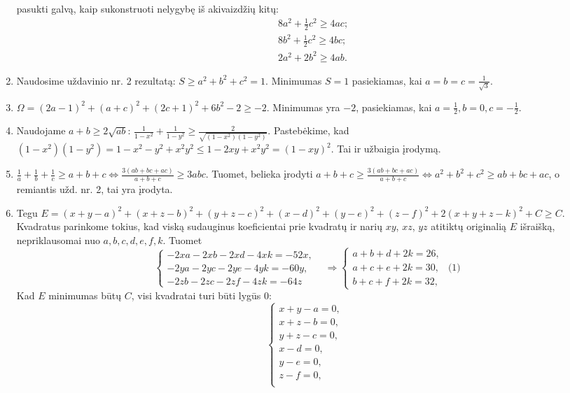 \begin{enumerate}
    pasukti galvą, kaip sukonstruoti nelygybę iš akivaizdžių kitų:
    \begin{align*}
    &8a^2+\frac{1}{2}c^2\geq 4ac;\\ &8b^2+\frac{1}{2}c^2\geq 4bc;\\
    &2a^2+2b^2\geq4ab. \end{align*}
\item
    Naudosime uždavinio nr. 2 rezultatą: $S\geq a^2+b^2+c^2=1.$ Minimumas
    $S=1$ pasiekiamas, kai $a=b=c=\frac{1}{\sqrt{3}}$.
\item
    $\Omega=(2a-1)^2+(a+c)^2+(2c+1)^2+6b^2-2\geq -2$. Minimumas yra $-2$,
    pasiekiamas, kai $a=\frac{1}{2}, b=0, c=-\frac{1}{2}$.
\item
    Naudojame $a+b\geq2\sqrt{ab}$:
    $\frac{1}{1-x^2}+\frac{1}{1-y^2}\geq\frac{2}{\sqrt{(1-x^2)(1-y^2)}}$.
    Pastebėkime, kad
    $(1-x^2)(1-y^2)=1-x^2-y^2+x^2y^2\leq1-2xy+x^2y^2=(1-xy)^2.$ Tai ir
    užbaigia įrodymą.
\item
    $\frac{1}{a}+\frac{1}{b}+\frac{1}{c}\geq
    a+b+c\Leftrightarrow\frac{3(ab+bc+ac)}{a+b+c}\geq3abc.$ Tuomet,
    belieka įrodyti $a+b+c\geq\frac{3(ab+bc+ac)}{a+b+c}\Leftrightarrow
    a^2+b^2+c^2\geq ab+bc+ac$, o remiantis užd. nr. 2, tai yra įrodyta.
\item
    Tegu
    $E=(x+y-a)^2+(x+z-b)^2+(y+z-c)^2+(x-d)^2+(y-e)^2+(z-f)^2+2(x+y+z-k)^2+C
    \geq C$. Kvadratus parinkome tokius, kad viską sudauginus koeficientai
    prie kvadratų ir narių $xy$, $xz$, $yz$ atitiktų originalią $E$
    išraišką, nepriklausomai nuo $a,b,c,d,e,f,k$. Tuomet
    \begin{equation*}\left\{ \begin{array}{ll} -2xa-2xb-2xd-4xk=-52x, & \\
    -2ya-2yc-2ye-4yk=-60y, & \\ -2zb-2zc-2zf-4zk=-64z & \end{array}
    \right. \Rightarrow \left\{ \begin{array}{ll} a+b+d+2k=26, &  \\
    a+c+e+2k=30, &  \mbox{(1)} \\ b+c+f+2k=32, & \end{array} \right.
    \end{equation*} Kad $E$ minimumas būtų $C$, visi kvadratai turi būti
    lygūs 0: \begin{equation*}\left\{ \begin{array}{ll} x+y-a=0, &  \\
    x+z-b=0, &  \\ y+z-c=0, &  \\ x-d=0, &  \\ y-e=0, &  \\ z-f=0, &  \\

\end{array}
\end{equation*}
\end{enumerate}
